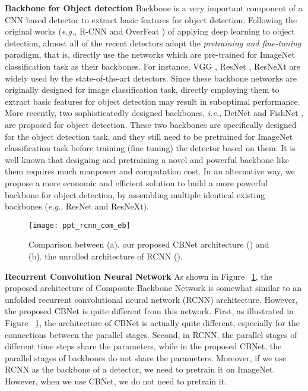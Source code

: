 \documentclass[letterpaper]{article} \usepackage{aaai20}  \usepackage{multirow}
\begin{document}
\textbf{Backbone for Object detection}
Backbone is a very important component of a CNN based detector to extract basic features for object detection. Following the original works (\textit{e.g.}, R-CNN \cite{girshick2014rich} and OverFeat \cite{sermanet2013overfeat}) of applying deep learning to object detection, almost all of the recent detectors adopt the \textit{pretraining and fine-tuning} paradigm, that is, directly use the networks which are pre-trained for ImageNet classification task as their backbones. For instance, VGG \cite{simonyan2014very}, ResNet \cite{he2016deep}, ResNeXt \cite{xie2017aggregated} are widely used by the state-of-the-art detectors. Since these backbone networks are originally designed for image classification task, directly employing them to extract basic features for object detection may result in suboptimal performance. More recently, two sophisticatedly designed backbones, \textit{i.e.}, DetNet \cite{li2018detnet} and FishNet \cite{sun2018fishnet}, are proposed for object detection. These two backbones are specifically designed for the object detection task, and they still need to be pretrained for ImageNet classification task before training (fine tuning) the detector based on them. It is well known that designing and pretraining a novel and powerful backbone like them requires much manpower and computation cost. In an alternative way, we propose a more economic and efficient solution to build a more powerful backbone for object detection, by assembling multiple identical existing backbones (\textit{e.g.}, ResNet and ResNeXt).

\begin{figure}[t]
	\centering
	\texttt{[image: ppt\_rcnn\_com\_eb]}
	\caption{Comparison between (a). our proposed CBNet architecture () and  (b). the unrolled architecture of RCNN \cite{liang2015recurrent}().}
	\label{fig:RCNN}
\end{figure}

\textbf{Recurrent Convolution Neural Network}
As shown in Figure ~\ref{fig:RCNN}, the proposed architecture of Composite Backbone Network is somewhat similar to an unfolded recurrent convolutional neural network (RCNN) \cite{liang2015recurrent} architecture. However, the proposed CBNet is quite different from this network. First, as illustrated in Figure ~\ref{fig:RCNN}, the architecture of CBNet is actually quite different, especially for the connections between the parallel stages. Second, in RCNN, the parallel stages of different time steps share the parameters, while in the proposed CBNet, the parallel stages of backbones do not share the parameters. Moreover, if we use RCNN as the backbone of a detector, we need to pretrain it on ImageNet. However, when we use CBNet, we do not need to pretrain it.
\end{document}

